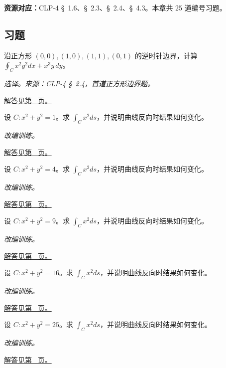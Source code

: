 \documentclass[UTF8,12pt,a4paper,fontset=fandol]{ctexart}
\begin{document}
\textbf{资源对应：}CLP-4 \S~1.6、\S~2.3、\S~2.4、\S~4.3。本章共 25 道编号习题。
\subsection{习题}
\begin{example}[正方形边界的直接积分]\label{ex:c41q1}
沿正方形 $(0,0),(1,0),(1,1),(0,1)$ 的逆时针边界，计算 $\oint_Cx^2y^2dx+x^3y\,dy$。
\par\textit{选译。来源：CLP-4 \S~2.4，首道正方形边界题。}\par\hyperref[ans:c41q1]{解答见第~\pageref{ans:c41q1} 页。}
\end{example}
\begin{example}[圆上的第一类曲线积分]\label{ex:c41q2}
设 $C:x^2+y^2=1$。求 $\displaystyle\int_Cx^2ds$，并说明曲线反向时结果如何变化。
\par\textit{改编训练。}\par\hyperref[ans:c41q2]{解答见第~\pageref{ans:c41q2} 页。}
\end{example}
\begin{example}[圆上的第一类曲线积分]\label{ex:c41q3}
设 $C:x^2+y^2=4$。求 $\displaystyle\int_Cx^2ds$，并说明曲线反向时结果如何变化。
\par\textit{改编训练。}\par\hyperref[ans:c41q3]{解答见第~\pageref{ans:c41q3} 页。}
\end{example}
\begin{example}[圆上的第一类曲线积分]\label{ex:c41q4}
设 $C:x^2+y^2=9$。求 $\displaystyle\int_Cx^2ds$，并说明曲线反向时结果如何变化。
\par\textit{改编训练。}\par\hyperref[ans:c41q4]{解答见第~\pageref{ans:c41q4} 页。}
\end{example}
\begin{example}[圆上的第一类曲线积分]\label{ex:c41q5}
设 $C:x^2+y^2=16$。求 $\displaystyle\int_Cx^2ds$，并说明曲线反向时结果如何变化。
\par\textit{改编训练。}\par\hyperref[ans:c41q5]{解答见第~\pageref{ans:c41q5} 页。}
\end{example}
\begin{example}[圆上的第一类曲线积分]\label{ex:c41q6}
设 $C:x^2+y^2=25$。求 $\displaystyle\int_Cx^2ds$，并说明曲线反向时结果如何变化。
\par\textit{改编训练。}\par\hyperref[ans:c41q6]{解答见第~\pageref{ans:c41q6} 页。}
\end{example}
\end{document}
